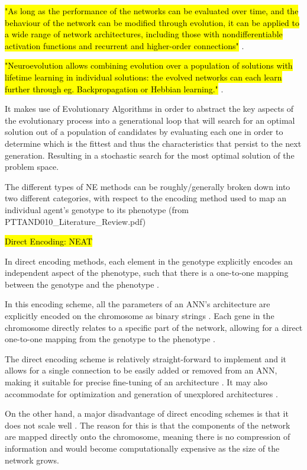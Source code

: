 \hl{"As long as the performance of the networks can be evaluated over time, and the behaviour of the network can be modified through evolution, it can be applied to a wide range of network architectures, including those with nondifferentiable activation functions and recurrent and higher-order connections"} \cite{Miikkulainen2010}.

\hl{"Neuroevolution allows combining evolution over a population of solutions with lifetime learning in individual solutions: the evolved networks can each learn further through eg. Backpropagation or Hebbian learning."} \cite{Miikkulainen2010}.

It makes use of Evolutionary Algorithms in order to abstract the key aspects of the evolutionary process into a generational loop that will search for an optimal solution out of a population of candidates by evaluating each one in order to determine which is the fittest and thus the characteristics that persist to the next generation. Resulting in a stochastic search for the most optimal solution of the problem space.

The different types of NE methods can be roughly/generally broken down into two different categories, with respect to the encoding method used to map an individual agent's genotype to its phenotype (from PTTAND010_Literature_Review.pdf)



\hl{Direct Encoding: NEAT}

In direct encoding methods, each element in the genotype explicitly encodes an independent aspect of the phenotype, such that there is a one-to-one mapping between the genotype and the phenotype \cite{clune2011performance, stanley2009hypercube}.

In this encoding scheme, all the parameters of an ANN's architecture are explicitly encoded on the chromosome as binary strings \cite{Gomez2003}. Each gene in the chromosome directly relates to a specific part of the network, allowing for a direct one-to-one mapping from the genotype to the phenotype \cite{StanleyMiikkulainen2002}.

The direct encoding scheme is relatively straight-forward to implement and it allows for a single connection to be easily added or removed from an ANN, making it suitable for precise fine-tuning of an architecture \cite{StanleyMiikkulainen2002}.
It may also accommodate for optimization and generation of unexplored architectures \cite{miller1989designing}.

On the other hand, a major disadvantage of direct encoding schemes is that it does not scale well \cite{XinYao1999}.  The reason for this is that the components of the network are mapped directly onto the chromosome, meaning there is no compression of information and would become computationally expensive as the size of the network grows.

